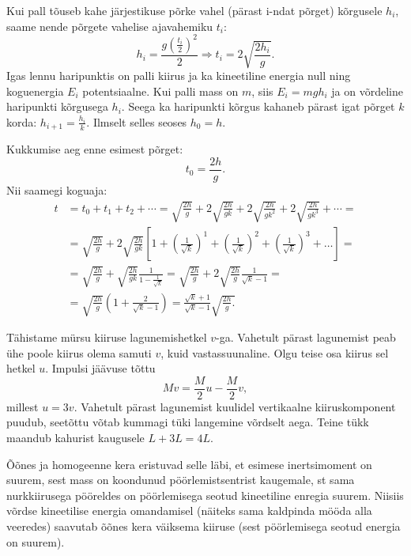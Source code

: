 \documentclass[10pt, twoside]{article}
\begin{document}
{%

\solu
Kui pall tõuseb kahe järjestikuse põrke vahel (pärast i-ndat põrget) kõrgusele $h_i$, saame nende põrgete vahelise ajavahemiku $t_i$:
\[
h_{i}=\frac{g\left(\frac{t_{i}}{2}\right)^{2}}{2} \Longrightarrow t_{i}=2 \sqrt{\frac{2 h_{i}}{g}}.
\]
Igas lennu haripunktis on palli kiirus ja ka kineetiline energia null ning koguenergia $E_i$ potentsiaalne. Kui palli mass on $m$, siis $E_i = mgh_i$ ja on võrdeline haripunkti kõrgusega $h_i$. Seega ka haripunkti kõrgus kahaneb pärast igat põrget $k$ korda: $h_{i+1} = \frac{h_i}{k}$. Ilmselt selles seoses $h_0 = h$.

Kukkumise aeg enne esimest põrget:
\[
t_0 = \frac{2h}{g}.
\]
Nii saamegi koguaja:
\[
\begin{aligned} 
	t &=t_{0}+t_{1}+t_{2}+\cdots=\sqrt{\frac{2 h}{g}}+2 \sqrt{\frac{2 h}{g k}} + 2 \sqrt{\frac{2 h}{g k^{2}}}+2 \sqrt{\frac{2 h}{g k^{3}}}+\cdots=\\ &=\sqrt{\frac{2 h}{g}}+2 \sqrt{\frac{2 h}{g k}}\left[1+\left(\frac{1}{\sqrt{k}}\right)^{1}+\left(\frac{1}{\sqrt{k}}\right)^{2}+\left(\frac{1}{\sqrt{k}}\right)^{3}+\ldots\right]=\\ &=\sqrt{\frac{2 h}{g}}+\sqrt{\frac{2 h}{g k}} \frac{1}{1-\frac{1}{\sqrt{k}}}=\sqrt{\frac{2 h}{g}}+2 \sqrt{\frac{2 h}{g}} \frac{1}{\sqrt{k}-1}=\\ &=\sqrt{\frac{2 h}{g}}\left(1+\frac{2}{\sqrt{k}-1}\right)=\frac{\sqrt{k}+1}{\sqrt{k}-1} \sqrt{\frac{2 h}{g}.} 
\end{aligned}
\]
\probend
\bigskip


\solu
Tähistame mürsu kiiruse lagunemishetkel $v$-ga. Vahetult pärast lagunemist peab ühe poole kiirus olema samuti $v$, kuid vastassuunaline. Olgu teise osa kiirus sel hetkel $u$. Impulsi jäävuse tõttu
\[
Mv = \frac{M}{2}u - \frac{M}{2}v,
\]
millest $u=3v$. Vahetult pärast lagunemist kuulidel vertikaalne kiiruskomponent puudub, seetõttu võtab kummagi tüki langemine võrdselt aega. Teine
tükk maandub kahurist kaugusele $L + 3L = 4L$.
\probend
\bigskip


\solu
Õõnes ja homogeenne kera eristuvad selle läbi, et esimese inertsimoment on suurem, sest
mass on koondunud pöörlemistsentrist kaugemale, st sama nurkkiirusega pööreldes on pöörlemisega seotud kineetiline enregia suurem. 
Niisiis võrdse kineetilise energia omandamisel (näiteks sama kaldpinda mööda alla veeredes) saavutab 
õõnes kera väiksema kiiruse (sest pöörlemisega seotud energia on suurem). 

}
\end{document}
